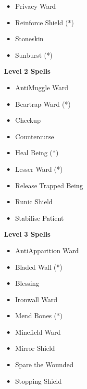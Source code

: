 \begin{multicols}{4}
{\begin{itemize}[itemsep=0em]
\item Privacy Ward

\item Reinforce Shield (*) 

\item Stoneskin

\item Sunburst (*) 


\end{itemize}
\textbf{Level 2 Spells}
\begin{itemize}[itemsep=0em]
\renewcommand\labelitemi{-}
\item Anti\minus{}Muggle Ward

\item Beartrap Ward (*) 

\item Checkup

\item Countercurse

\item Heal Being (*) 

\item Lesser Ward (*) 

\item Release Trapped Being

\item Runic Shield

\item Stabilise Patient


\end{itemize}
\textbf{Level 3 Spells}
\begin{itemize}[itemsep=0em]
\renewcommand\labelitemi{-}
\item Anti\minus{}Apparition Ward

\item Bladed Wall (*) 

\item Blessing

\item Ironwall Ward

\item Mend Bones (*) 

\item Minefield Ward

\item Mirror Shield

\item Spare the Wounded

\item Stopping Shield


\end{itemize}}
\end{multicols}
